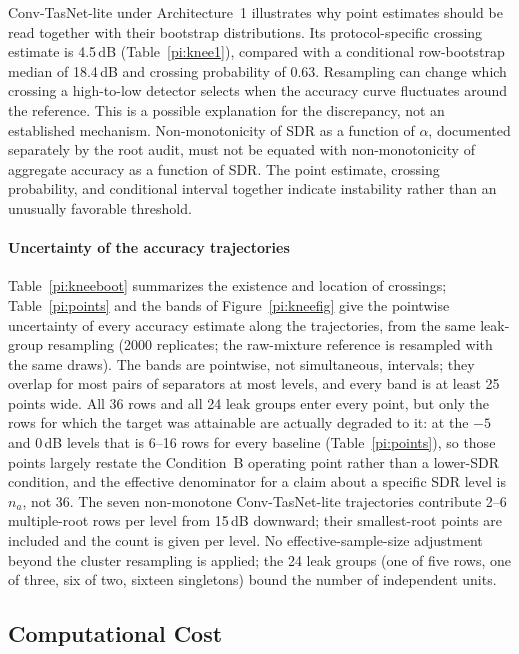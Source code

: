 \documentclass[journal]{IEEEtran}
\begin{document}
Conv-TasNet-lite under Architecture~1 illustrates why point estimates should be read together with their bootstrap distributions. Its protocol-specific crossing estimate is 4.5\,dB (Table~\ref{pi:knee1}), compared with a conditional row-bootstrap median of 18.4\,dB and crossing probability of 0.63. Resampling can change which crossing a high-to-low detector selects when the accuracy curve fluctuates around the reference. This is a possible explanation for the discrepancy, not an established mechanism. Non-monotonicity of SDR as a function of $\alpha$, documented separately by the root audit, must not be equated with non-monotonicity of aggregate accuracy as a function of SDR. The point estimate, crossing probability, and conditional interval together indicate instability rather than an unusually favorable threshold.

\paragraph{Uncertainty of the accuracy trajectories}
Table~\ref{pi:kneeboot} summarizes the existence and location of crossings; Table~\ref{pi:points} and the bands of Figure~\ref{pi:kneefig} give the pointwise uncertainty of every accuracy estimate along the trajectories, from the same leak-group resampling (2000 replicates; the raw-mixture reference is resampled with the same draws). The bands are pointwise, not simultaneous, intervals; they overlap for most pairs of separators at most levels, and every band is at least 25 points wide. All 36 rows and all 24 leak groups enter every point, but only the rows for which the target was attainable are actually degraded to it: at the $-5$ and 0\,dB levels that is 6--16 rows for every baseline (Table~\ref{pi:points}), so those points largely restate the Condition~B operating point rather than a lower-SDR condition, and the effective denominator for a claim about a specific SDR level is $n_a$, not 36. The seven non-monotone Conv-TasNet-lite trajectories contribute 2--6 multiple-root rows per level from 15\,dB downward; their smallest-root points are included and the count is given per level. No effective-sample-size adjustment beyond the cluster resampling is applied; the 24 leak groups (one of five rows, one of three, six of two, sixteen singletons) bound the number of independent units.

\subsection{Computational Cost}
\end{document}
